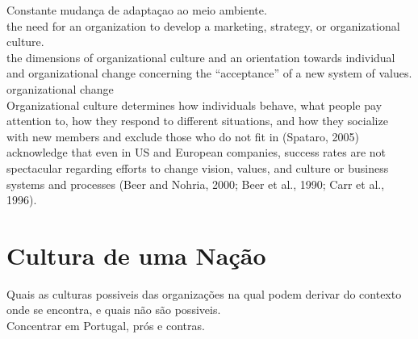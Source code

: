 Constante mudança de adaptaçao ao meio ambiente.\\

the need for an organization to develop a marketing, strategy, or organizational culture.\\
the dimensions of organizational culture and an orientation towards individual and organizational change concerning the “acceptance” of a new system of values.\\

organizational change \\

Organizational culture determines how individuals behave, what people pay attention to,
how they respond to different situations, and how they socialize with new members and
exclude those who do not fit in (Spataro, 2005) \\

acknowledge that even in US and European companies, success rates are
not spectacular regarding efforts to change vision, values, and culture or business systems
and processes (Beer and Nohria, 2000; Beer et al., 1990; Carr et al., 1996).\\



\section{Cultura de uma Nação}
Quais as culturas possiveis das organizações na qual podem derivar do contexto onde se encontra, e quais não são possiveis.\\

Concentrar em Portugal, prós e contras.\\

